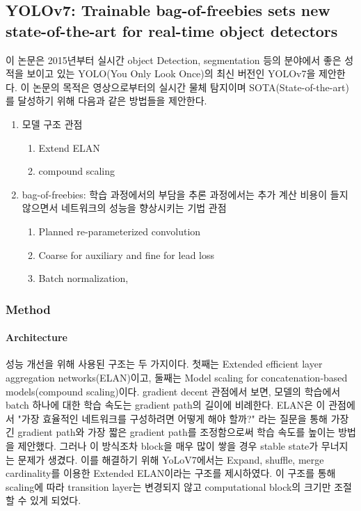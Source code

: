 \subsection{YOLOv7: Trainable bag-of-freebies sets new state-of-the-art for real-time object detectors}{\label{subsec:yolov7}}
이 논문은 2015년부터 실시간 object Detection, segmentation 등의 분야에서 좋은 성적을 보이고 있는
YOLO(You Only Look Once)의 최신 버전인 YOLOv7을 제안한다.
이 논문의 목적은 영상으로부터의 실시간 물체 탐지이며 SOTA(State-of-the-art)를 달성하기 위해 다음과 같은 방법들을 제안한다.
 \begin{enumerate}\tightlist
    \item 모델 구조 관점
    \begin{enumerate}\tightlist
        \item Extend ELAN
        \item compound scaling
    \end{enumerate}
    \item bag-of-freebies: 학습 과정에서의 부담을 추론 과정에서는 추가 계산 비용이 들지 않으면서 네트워크의 성능을 향상시키는 기법 관점
    \begin{enumerate}\tightlist
        \item Planned re-parameterized convolution
        \item Coarse for auxiliary and fine for lead loss
        \item Batch normalization, 
    \end{enumerate}
\end{enumerate}

\subsubsection{Method}{\label{subsubsec:yolov7_method}}
\paragraph*{Architecture}
성능 개선을 위해 사용된 구조는 두 가지이다.
첫째는 Extended efficient layer aggregation networks(ELAN)이고,
둘째는 Model scaling for concatenation-based models(compound scaling)이다.
gradient decent 관점에서 보면, 모델의 학습에서 batch 하나에 대한 학습 속도는 gradient path의 길이에 비례한다.
ELAN은 이 관점에서 "가장 효율적인 네트워크를 구성하려면 어떻게 해야 할까?" 라는 질문을 통해
가장 긴 gradient path와 가장 짧은 gradient path를 조정함으로써 학습 속도를 높이는 방법을 제안했다.
그러나 이 방식조차 block을 매우 많이 쌓을 경우 stable state가 무너지는 문제가 생겼다.
이를 해결하기 위해 YoLoV7에서는 Expand, shuffle, merge cardinality를 이용한 Extended ELAN이라는 구조를 제시하였다.
이 구조를 통해 scaling에 따라 transition layer는 변경되지 않고 computational block의 크기만 조절할 수 있게 되었다.

